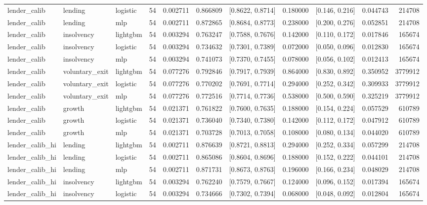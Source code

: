 \begin{table}
{\begin{tabular}{lllrrrlrlrr}
lender_calib & lending & logistic & 54 & 0.002711 & 0.866809 & [0.8622, 0.8714] & 0.180000 & [0.146, 0.216] & 0.044743 & 214708 \\
lender_calib & lending & mlp & 54 & 0.002711 & 0.872865 & [0.8684, 0.8773] & 0.238000 & [0.200, 0.276] & 0.052851 & 214708 \\
lender_calib & insolvency & lightgbm & 54 & 0.003294 & 0.763247 & [0.7588, 0.7676] & 0.142000 & [0.110, 0.172] & 0.017846 & 165674 \\
lender_calib & insolvency & logistic & 54 & 0.003294 & 0.734632 & [0.7301, 0.7389] & 0.072000 & [0.050, 0.096] & 0.012830 & 165674 \\
lender_calib & insolvency & mlp & 54 & 0.003294 & 0.741073 & [0.7370, 0.7455] & 0.078000 & [0.056, 0.102] & 0.012413 & 165674 \\
lender_calib & voluntary_exit & lightgbm & 54 & 0.077276 & 0.792846 & [0.7917, 0.7939] & 0.864000 & [0.830, 0.892] & 0.350952 & 3779912 \\
lender_calib & voluntary_exit & logistic & 54 & 0.077276 & 0.770202 & [0.7691, 0.7714] & 0.294000 & [0.252, 0.342] & 0.309933 & 3779912 \\
lender_calib & voluntary_exit & mlp & 54 & 0.077276 & 0.772516 & [0.7714, 0.7736] & 0.538000 & [0.500, 0.590] & 0.325219 & 3779912 \\
lender_calib & growth & lightgbm & 54 & 0.021371 & 0.761822 & [0.7600, 0.7635] & 0.188000 & [0.154, 0.224] & 0.057529 & 610789 \\
lender_calib & growth & logistic & 54 & 0.021371 & 0.736040 & [0.7340, 0.7380] & 0.142000 & [0.112, 0.172] & 0.047912 & 610789 \\
lender_calib & growth & mlp & 54 & 0.021371 & 0.703728 & [0.7013, 0.7058] & 0.108000 & [0.080, 0.134] & 0.044020 & 610789 \\
lender_calib_hi & lending & lightgbm & 54 & 0.002711 & 0.876639 & [0.8721, 0.8813] & 0.294000 & [0.252, 0.334] & 0.057299 & 214708 \\
lender_calib_hi & lending & logistic & 54 & 0.002711 & 0.865086 & [0.8604, 0.8696] & 0.188000 & [0.152, 0.222] & 0.044101 & 214708 \\
lender_calib_hi & lending & mlp & 54 & 0.002711 & 0.871731 & [0.8673, 0.8763] & 0.196000 & [0.166, 0.234] & 0.048029 & 214708 \\
lender_calib_hi & insolvency & lightgbm & 54 & 0.003294 & 0.762240 & [0.7579, 0.7667] & 0.124000 & [0.096, 0.152] & 0.017394 & 165674 \\
lender_calib_hi & insolvency & logistic & 54 & 0.003294 & 0.734666 & [0.7302, 0.7394] & 0.068000 & [0.048, 0.092] & 0.012804 & 165674 \\

\end{tabular}}
\end{table}
